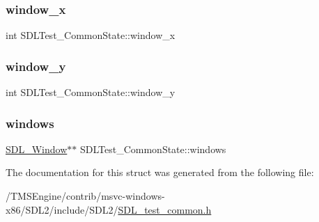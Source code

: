 \subsubsection{\texorpdfstring{window\+\_\+x}{window\_x}}
{\footnotesize\ttfamily int S\+D\+L\+Test\+\_\+\+Common\+State\+::window\+\_\+x}

\mbox{\label{struct_s_d_l_test___common_state_a1fcd61cbe37c2bb563e7b2f1c6853d29}} 
\subsubsection{\texorpdfstring{window\+\_\+y}{window\_y}}
{\footnotesize\ttfamily int S\+D\+L\+Test\+\_\+\+Common\+State\+::window\+\_\+y}

\mbox{\label{struct_s_d_l_test___common_state_a0a054f0c45eb9d21f9561d701e721106}} 
\subsubsection{\texorpdfstring{windows}{windows}}
{\footnotesize\ttfamily \hyperlink{_s_d_l__video_8h_a55a196c7d3b8497538632c79ae1e6392}{S\+D\+L\+\_\+\+Window}$\ast$$\ast$ S\+D\+L\+Test\+\_\+\+Common\+State\+::windows}



The documentation for this struct was generated from the following file\+:\begin{DoxyCompactItemize}
\item 
/\+T\+M\+S\+Engine/contrib/msvc-\/windows-\/x86/\+S\+D\+L2/include/\+S\+D\+L2/\hyperlink{_s_d_l__test__common_8h}{S\+D\+L\+\_\+test\+\_\+common.\+h}\end{DoxyCompactItemize}
